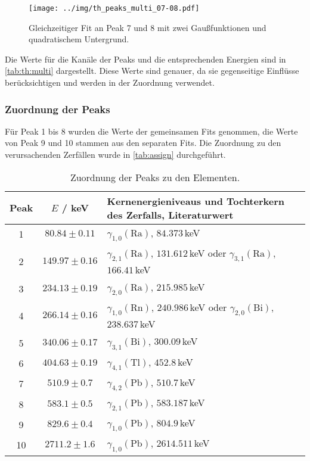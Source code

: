 \begin{figure}[H]
\begin{center}
  \texttt{[image: ../img/th\_peaks\_multi\_07-08.pdf]}
  \caption{Gleichzeitiger Fit an Peak 7 und 8 mit zwei Gaußfunktionen und quadratischem Untergrund.}
  \label{img:th:peaks:multi:0708}
\end{center}
\end{figure}
Die Werte für die Kanäle der Peaks und die entsprechenden Energien sind in \autoref{tab:th:multi} dargestellt. Diese Werte sind genauer, da sie 
gegenseitige Einflüsse berücksichtigen und werden in der Zuordnung verwendet.


\subsubsection{Zuordnung der Peaks}
Für Peak 1 bis 8 wurden die Werte der gemeinsamen Fits genommen, die Werte von Peak 9 und 10 stammen aus den separaten Fits.
Die Zuordnung zu den verursachenden Zerfällen wurde in \autoref{tab:assign} durchgeführt.\\[\baselineskip]
\begin{table}
\caption{Zuordnung der Peaks zu den Elementen.}
\begin{center}
\begin{tabularx}{\textwidth}{|c|c|X|}
  \hline 
    Peak & $E$ / keV & Kernenergieniveaus und Tochterkern des Zerfalls, Literaturwert \\ \hline
      1 & $  80.84 \pm 0.11 $ &  $\gamma_{1,0}(\text{Ra})$, $84.373$\,keV \\ \hline
      2 & $ 149.97 \pm 0.16 $ &  $\gamma_{2,1}(\text{Ra})$, $131.612$\,keV oder $\gamma_{3,1}(\text{Ra})$, $166.41$\,keV \\ \hline
      3 & $ 234.13 \pm 0.19 $ &  $\gamma_{2,0}(\text{Ra})$, $215.985$\,keV \\ \hline
      4 & $ 266.14 \pm 0.16 $ &  $\gamma_{1,0}(\text{Rn})$, $240.986$\,keV oder $\gamma_{2,0}(\text{Bi})$, $238.637$\,keV \\ \hline
      5 & $ 340.06 \pm 0.17 $ &  $\gamma_{3,1}(\text{Bi})$, $300.09$\,keV \\ \hline
      6 & $ 404.63 \pm 0.19 $ &  $\gamma_{4,1}(\text{Tl})$, $452.8$\,keV \\ \hline
      7 & $ 510.9  \pm 0.7  $ &  $\gamma_{4,2}(\text{Pb})$, $510.7$\,keV \\ \hline
      8 & $ 583.1  \pm 0.5  $ &  $\gamma_{2,1}(\text{Pb})$, $583.187$\,keV \\ \hline
      9 & $ 829.6  \pm 0.4  $ &  $\gamma_{1,0}(\text{Pb})$, $804.9$\,keV \\ \hline
     10 & $ 2711.2 \pm 1.6  $ &  $\gamma_{1,0}(\text{Pb})$, $2614.511$\,keV \\ \hline
\end{tabularx}
\end{center}
\label{tab:assign}
\end{table}
